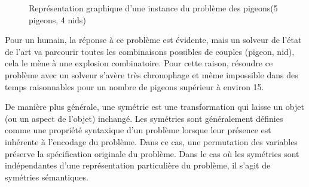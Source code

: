  
 \begin{figure}[!htbp]
  \centering
  \caption{Représentation graphique d'une instance du problème des pigeons(5 pigeons, 4 nids)}
  \label{fig:holefr}
 \end{figure}
 
 
Pour un humain, la réponse à ce problème est évidente, mais un solveur de l'état de l'art va parcourir toutes 
les combinaisons possibles de couples (pigeon, nid), cela le mène à une explosion combinatoire.
Pour cette raison, résoudre ce problème avec un solveur s'avère très chronophage et même impossible dans des temps raisonnables
pour un nombre de pigeons supérieur à environ 15.

%
%

De manière plus  générale, une symétrie est une transformation qui laisse un objet (ou un aspect de l'objet) inchangé. Les symétries sont généralement définies comme une propriété syntaxique d'un problème lorsque leur présence est inhérente à l'encodage du problème.
Dans ce cas, une permutation des variables préserve la spécification originale du problème.
Dans le cas où les symétries sont indépendantes d'une représentation particulière du problème, il s'agit de symétries sémantiques.

